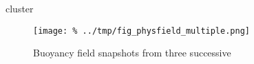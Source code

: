 
cluster



\begin{figure}%
\centering
\texttt{[image: \%
../tmp/fig\_physfield\_multiple.png]}
\caption{Buoyancy field snapshots from three successive}
\end{figure}
